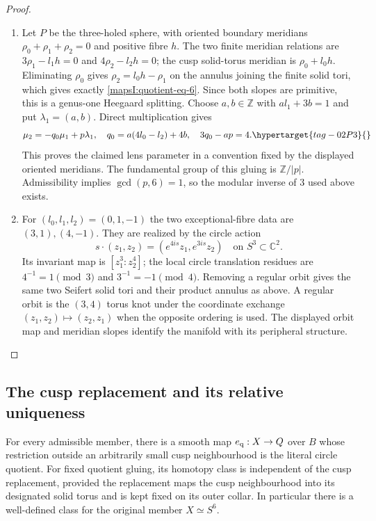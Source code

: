 \begin{proof}
\begin{enumerate}[label=\arabic*.,leftmargin=*]
\item Let $P$ be the three-holed sphere, with oriented boundary
meridians $\rho_0+\rho_1+\rho_2=0$ and positive fibre $h$.
The two finite meridian relations are
$3\rho_1-l_1h=0$ and $4\rho_2-l_2h=0$; the cusp solid-torus
meridian is $\rho_0+l_0h$.  Eliminating $\rho_0$ gives
$\rho_2=l_0h-\rho_1$ on the annulus joining the finite solid
tori, which gives exactly \eqref{mapsI:quotient-eq-6}.  Since both slopes are
primitive, this is a genus-one Heegaard splitting.  Choose
$a,b\in\mathbb Z$ with $al_1+3b=1$ and put
$\lambda_1=(a,b)$.  Direct multiplication gives
\[
 \mu_2=-q_0\mu_1+p\lambda_1,
 \quad q_0=a(4l_0-l_2)+4b,
 \quad 3q_0-ap=4.
 \hypertarget{tag-02P3}{}\label{mapsI:quotient-eq-7}
\]
This proves the claimed lens parameter in a convention fixed
by the displayed oriented meridians.  The fundamental
group of this gluing is $\mathbb Z/|p|$.  Admissibility implies
$\gcd(p,6)=1$, so the modular inverse of $3$ used above exists.

\item For $(l_0,l_1,l_2)=(0,1,-1)$ the two exceptional-fibre data
are $(3,1),(4,-1)$.  They are realized by the circle action
\[
 s\cdot(z_1,z_2)=(e^{4is}z_1,e^{3is}z_2)
 \quad\text{on } S^3\subset\mathbb C^2.
\]
Its invariant map is $[z_1^3:z_2^4]$; the local circle
translation residues are $4^{-1}=1\pmod3$ and
$3^{-1}=-1\pmod4$.  Removing a regular orbit gives the
same two Seifert solid tori and their product annulus as
above. A regular orbit is the $(3,4)$ torus knot under the coordinate
exchange $(z_1,z_2)\mapsto(z_2,z_1)$ when the opposite ordering is used.
The displayed orbit map and meridian slopes identify the manifold
with its peripheral structure.
\end{enumerate}
\end{proof}

\subsection{The cusp replacement and its relative uniqueness}

\begin{theorem}\hypertarget{tag-02PD}{}\label{mapsI:src:A.2.1}

For every admissible member, there is a smooth map
$e_{\rm q}:X\to Q$ over $B$ whose restriction outside an arbitrarily
small cusp neighbourhood is the literal circle quotient.
For fixed quotient gluing, its homotopy class is independent
of the cusp replacement, provided the replacement maps the
cusp neighbourhood into its designated solid torus and is
kept fixed on its outer collar.  In particular there is a
well-defined class for the original member $X\simeq S^6$.
\end{theorem}



